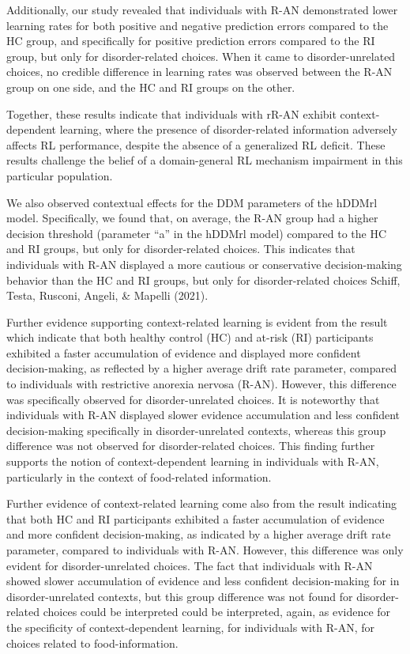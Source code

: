 \documentclass[
  man,floatsintext]{apa6}
\begin{document}
Additionally, our study revealed that individuals with R-AN demonstrated lower learning rates for both positive and negative prediction errors compared to the HC group, and specifically for positive prediction errors compared to the RI group, but only for disorder-related choices. When it came to disorder-unrelated choices, no credible difference in learning rates was observed between the R-AN group on one side, and the HC and RI groups on the other.

Together, these results indicate that individuals with rR-AN exhibit context-dependent learning, where the presence of disorder-related information adversely affects RL performance, despite the absence of a generalized RL deficit. These results challenge the belief of a domain-general RL mechanism impairment in this particular population.

We also observed contextual effects for the DDM parameters of the hDDMrl model. Specifically, we found that, on average, the R-AN group had a higher decision threshold (parameter ``a'' in the hDDMrl model) compared to the HC and RI groups, but only for disorder-related choices. This indicates that individuals with R-AN displayed a more cautious or conservative decision-making behavior than the HC and RI groups, but only for disorder-related choices Schiff, Testa, Rusconi, Angeli, \& Mapelli (2021).

Further evidence supporting context-related learning is evident from the result which indicate that both healthy control (HC) and at-risk (RI) participants exhibited a faster accumulation of evidence and displayed more confident decision-making, as reflected by a higher average drift rate parameter, compared to individuals with restrictive anorexia nervosa (R-AN). However, this difference was specifically observed for disorder-unrelated choices. It is noteworthy that individuals with R-AN displayed slower evidence accumulation and less confident decision-making specifically in disorder-unrelated contexts, whereas this group difference was not observed for disorder-related choices. This finding further supports the notion of context-dependent learning in individuals with R-AN, particularly in the context of food-related information.

Further evidence of context-related learning come also from the result indicating that both HC and RI participants exhibited a faster accumulation of evidence and more confident decision-making, as indicated by a higher average drift rate parameter, compared to individuals with R-AN. However, this difference was only evident for disorder-unrelated choices. The fact that individuals with R-AN showed slower accumulation of evidence and less confident decision-making for in disorder-unrelated contexts, but this group difference was not found for disorder-related choices could be interpreted could be interpreted, again, as evidence for the specificity of context-dependent learning, for individuals with R-AN, for choices related to food-information.
\end{document}
